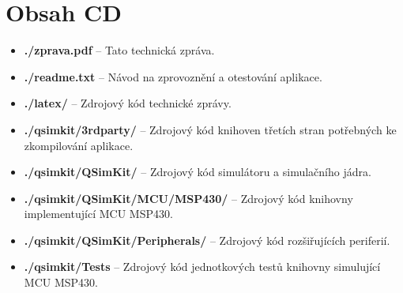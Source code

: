 \chapter{Obsah CD}

\begin{itemize}
\item \textbf{./zprava.pdf} -- Tato technická zpráva.
\item \textbf{./readme.txt} -- Návod na zprovoznění a otestování aplikace.
\item \textbf{./latex/} -- Zdrojový kód technické zprávy.
\item \textbf{./qsimkit/3rdparty/} -- Zdrojový kód knihoven třetích stran potřebných ke zkompilování aplikace.
\item \textbf{./qsimkit/QSimKit/} -- Zdrojový kód simulátoru a simulačního jádra.
\item \textbf{./qsimkit/QSimKit/MCU/MSP430/} -- Zdrojový kód knihovny implementující MCU MSP430.
\item \textbf{./qsimkit/QSimKit/Peripherals/} -- Zdrojový kód rozšiřujících periferií.
\item \textbf{./qsimkit/Tests} -- Zdrojový kód jednotkových testů knihovny simulující MCU MSP430.
\end{itemize}
